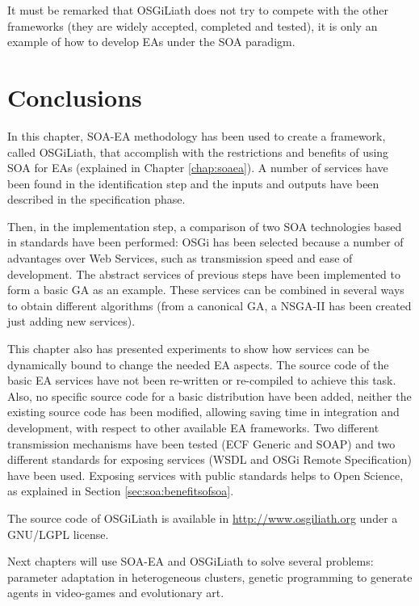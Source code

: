It must be remarked that OSGiLiath does not try to compete with the
other frameworks (they are widely accepted, completed and tested), it
is only an example of how to develop EAs under the SOA paradigm. %


\section{Conclusions}

In this chapter, SOA-EA methodology has been used to create a framework, called OSGiLiath, that accomplish with the restrictions and benefits of using SOA for EAs (explained in Chapter \ref{chap:soaea}). A number of services have been found in the identification step and the inputs and outputs have been described in the specification phase. 

Then, in the implementation step, a comparison of two SOA technologies based in standards have been performed: OSGi has been selected because a number of advantages over Web Services, such as transmission speed and ease of development. The abstract services of previous steps have been implemented to form a basic GA as an example. These services can be combined in several ways to obtain different algorithms (from a canonical GA, a NSGA-II has been created just adding new services). 

This chapter also has presented experiments to show how services can be dynamically bound to change the needed EA aspects. The source code of the basic EA services have not been re-written or re-compiled to achieve this task. Also, no specific source code for a basic distribution have been added, neither the existing source code has been modified, allowing saving time in integration and development, with respect to other available EA frameworks. Two different transmission mechanisms have been tested (ECF Generic and SOAP) and two different standards for exposing services (WSDL and OSGi Remote Specification) have been used. Exposing services with public standards helps to Open Science, as explained in Section \ref{sec:soa:benefitsofsoa}.

The source code of OSGiLiath is available in \url{http://www.osgiliath.org} under a GNU/LGPL license.

Next chapters will use SOA-EA and OSGiLiath to solve several problems: parameter adaptation in heterogeneous clusters, genetic programming to generate agents in video-games and evolutionary art.
